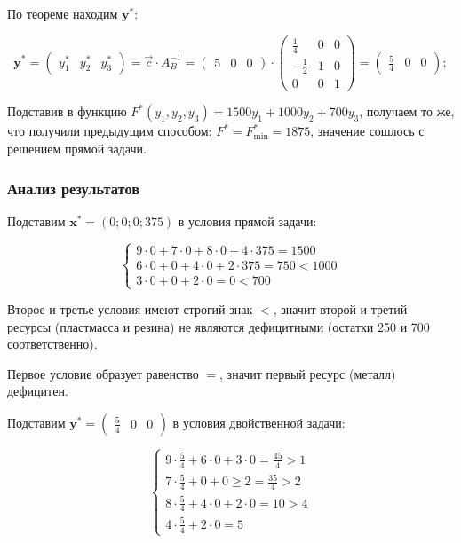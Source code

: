По теореме находим $ \mathbf{y^*}  $:

\[ \mathbf{y^*}= \begin{pmatrix}
        y_1^* & y_2^* & y_3^*
    \end{pmatrix}= \overrightarrow{c} \cdot A_B^{ -1} = \begin{pmatrix}
        5 & 0 & 0
    \end{pmatrix} \cdot
    \begin{pmatrix}
        \frac{ 1}{ 4} & 0 & 0 \\
        - \frac{1}{2} & 1 & 0 \\
        0             & 0 & 1
    \end{pmatrix} = \begin{pmatrix}
        \frac{ 5}{ 4} & 0 & 0
    \end{pmatrix}
    ;\]

Подставив в функцию $ F^{ *}(y_{ 1}, y_{ 2}, y_{ 3}) = 1500y_{ 1} + 1000y_{ 2} + 700y_{ 3} $, получаем то же, что получили предыдущим способом: $ F^{ *} = F_{ \min}^{ *} = 1875 $,
значение сошлось с решением прямой задачи.

\subsubsection{Анализ результатов}

Подставим $ \mathbf{x^*} = \left(0; 0; 0; 375\right)$ в условия прямой задачи:

\[
    \begin{cases}
        9 \cdot 0 + 7 \cdot 0 + 8 \cdot 0 + 4 \cdot 375 = 1500 \\
        6 \cdot 0 + 0 + 4 \cdot 0 + 2 \cdot 375 = 750 < 1000   \\
        3 \cdot 0 + 0 + 2 \cdot 0 = 0 < 700
    \end{cases}
\]

Второе и третье условия имеют строгий знак $<$, значит второй и третий ресурсы (пластмасса и резина) не являются дефицитными (остатки 250 и 700 соответственно).

Первое условие образует равенство $=$, значит первый ресурс (металл) дефицитен.

Подставим $ \mathbf{y^*} = \begin{pmatrix} \frac{ 5}{ 4} & 0 & 0 \end{pmatrix}$ в условия двойственной задачи:

\[
    \begin{cases}
        9 \cdot \frac{5}{4} + 6 \cdot 0 + 3 \cdot 0 = \frac{ 45}{ 4} > 1 \\
        7 \cdot \frac{5}{4} + 0 + 0 \geq 2 = \frac{ 35}{ 4} > 2          \\
        8 \cdot \frac{5}{4} + 4 \cdot 0 + 2 \cdot 0 = 10 > 4             \\
        4 \cdot \frac{5}{4} + 2 \cdot 0 = 5
    \end{cases}
\]

